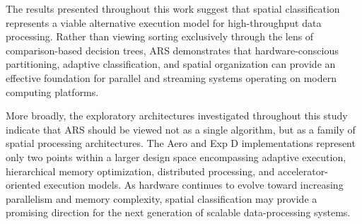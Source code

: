The results presented throughout this work suggest that spatial classification represents a viable alternative execution model for high-throughput data processing.
Rather than viewing sorting exclusively through the lens of comparison-based decision trees, ARS demonstrates that hardware-conscious partitioning, adaptive classification, and spatial organization can provide an effective foundation for parallel and streaming systems operating on modern computing platforms.

More broadly, the exploratory architectures investigated throughout this study indicate that ARS should be viewed not as a single algorithm, but as a family of spatial processing architectures.
The Aero and Exp D implementations represent only two points within a larger design space encompassing adaptive execution, hierarchical memory optimization, distributed processing, and accelerator-oriented execution models.
As hardware continues to evolve toward increasing parallelism and memory complexity, spatial classification may provide a promising direction for the next generation of scalable data-processing systems.
